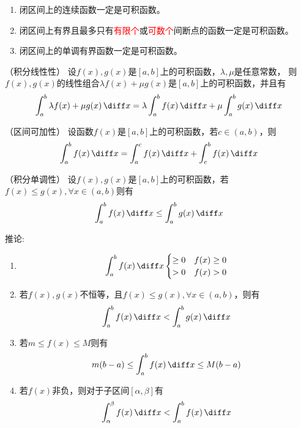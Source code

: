 \begin{theorem}
    \begin{enumerate}
        \item 闭区间上的连续函数一定是可积函数。
        \item 闭区间上有界且最多只有\textcolor{red}{有限个}或\textcolor{red}{可数个}间断点的函数一定是可积函数。
        \item 闭区间上的单调有界函数一定是可积函数。
    \end{enumerate}
\end{theorem}

\begin{theorem}
    （积分线性性）
    设$f(x),g(x)$是$[a,b]$上的可积函数，$\lambda,\mu$是任意常数，
    则$f(x),g(x)$的线性组合$\lambda f(x)+\mu g(x)$是$[a,b]$上的可积函数，并且有
    \[
        \int_a^b \lambda f(x)+\mu g(x)\, \diff x
        =
        \lambda\int_a^b f(x)\,\diff x + \mu\int_a^b g(x)\,\diff x
    \]
\end{theorem}

\begin{theorem}
    （区间可加性）
    设函数$f(x)$是$[a,b]$上的可积函数，若$c\in(a,b)$，则
    \[ \int_a^b f(x)\,\diff x = \int_a^c f(x)\,\diff x + \int_c^b f(x)\,\diff x \]
\end{theorem}

\begin{theorem}
    （积分单调性）
    设$f(x),g(x)$是$[a,b]$上的可积函数，若$f(x)\leq g(x), \forall x \in (a,b)$则有
    \[ \int_a^b f(x)\,\diff x \leq \int_a^b g(x)\,\diff x \]

    推论:
    \begin{enumerate}[(1)]
        \item \[
                  \int_a^b f(x)\,\diff x
                  \begin{cases}
                      \geq 0 & f(x)\geq 0 \\
                      > 0    & f(x) > 0
                  \end{cases}
              \]
        \item 若$f(x),g(x)$不恒等，且$f(x)\leq g(x),\forall x \in (a,b)$，则有
              \[ \int_a^b f(x)\,\diff x < \int_a^b g(x)\,\diff x \]
        \item 若$m \leq f(x) \leq M$则有
              \[ m(b-a) \leq \int_a^b f(x)\,\diff x \leq M(b-a) \]
        \item 若$f(x)$非负，则对于子区间$[\alpha,\beta]$有
              \[ \int_\alpha^\beta f(x)\,\diff x < \int_a^bf(x)\,\diff x \]
    \end{enumerate}
\end{theorem}

